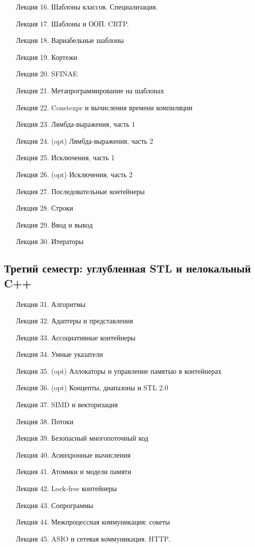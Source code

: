 \documentclass[a4paper,12pt,oneside]{article}
\begin{document}
\vspace{\baselineskip}
\begin{enumerate}
\item [Лекция 16.] Шаблоны классов. Специализация.
\item [Лекция 17.] Шаблоны и ООП. CRTP.
\item [Лекция 18.] Вариабельные шаблоны
\item [Лекция 19.] Кортежи
\item [Лекция 20.] SFINAE 
\item [Лекция 21.] Метапрограммирование на шаблонах
\item [Лекция 22.] Constexpr и вычисления времени компиляции
\item [Лекция 23.] Лямбда-выражения, часть 1
\item [Лекция 24.] (opt) Лямбда-выражения, часть 2
\item [Лекция 25.] Исключения, часть 1
\item [Лекция 26.] (opt) Исключения, часть 2
\item [Лекция 27.] Последовательные контейнеры 
\item [Лекция 28.] Строки
\item [Лекция 29.] Ввод и вывод 
\item [Лекция 30.] Итераторы 
\end{enumerate}

\pagebreak
\subsection*{Третий семестр: углубленная STL и нелокальный C++}

\vspace{\baselineskip}
\begin{enumerate}
\item [Лекция 31.] Алгоритмы
\item [Лекция 32.] Адаптеры и представления
\item [Лекция 33.] Ассоциативные контейнеры 
\item [Лекция 34.] Умные указатели
\item [Лекция 35.] (opt) Аллокаторы и управление памятью в контейнерах
\item [Лекция 36.] (opt) Концепты, диапазоны и STL 2.0
\item [Лекция 37.] SIMD и векторизация
\item [Лекция 38.] Потоки
\item [Лекция 39.] Безопасный многопоточный код
\item [Лекция 40.] Асинхронные вычисления
\item [Лекция 41.] Атомики и модели памяти
\item [Лекция 42.] Lock-free контейнеры
\item [Лекция 43.] Сопрограммы
\item [Лекция 44.] Межпроцессная коммуникация: сокеты
\item [Лекция 45.] ASIO и сетевая коммуникация. HTTP.
\end{enumerate}
\end{document}
